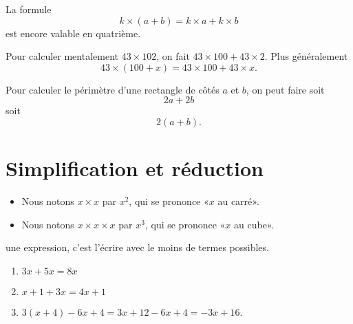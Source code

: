 \begin{Aretenir}
    La formule
    \begin{equation}
        k\times (a+b)= k\times a+k\times b
    \end{equation}
    est encore valable en quatrième.
\end{Aretenir}

\begin{example}
    Pour calculer mentalement \( 43\times 102\), on fait \( 43\times 100+43\times 2\). Plus généralement
    \begin{equation}
        43\times (100+x)=43\times 100+43\times x.
    \end{equation}
\end{example}

\begin{example}
    Pour calculer le périmètre d'une rectangle de côtés \( a\) et \( b\), on peut faire soit
    \begin{equation}
        2a+2b
    \end{equation}
    soit
    \begin{equation}
        2(a+b).
    \end{equation}
\end{example}


\section{Simplification et réduction}

\begin{definition}
    \begin{itemize}
        \item 
    Nous notons \( x\times x\) par \( x^2\), qui se prononce «\( x\) au carré».
\item
    Nous notons \( x\times x\times x\) par \( x^3\), qui se prononce «\( x\) au cube».
    \end{itemize}
\end{definition}

\begin{Aretenir}
     une expression, c'est l'écrire avec le moins de termes possibles.
\end{Aretenir}

\begin{example}
    \begin{enumerate}
        \item
            \( 3x+5x=8x\)
        \item
            \( x+1+3x=4x+1\)
        \item
            \( 3(x+4)-6x+4=3x+12-6x+4=-3x+16\).
    \end{enumerate}
\end{example}

